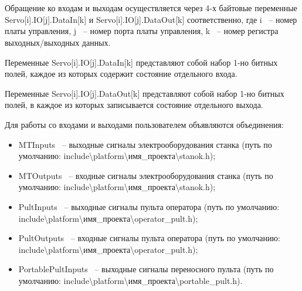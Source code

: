 



\section{}


Обращение ко входам и выходам осуществляется через 4-х байтовые переменные Servo[i].IO[j].DataIn[k] и Servo[i].IO[j].DataOut[k] соответственно, где i ~-- номер платы управления, j ~-- номер порта платы управления, k ~-- номер регистра выходных/выходных данных.

Переменные Servo[i].IO[j].DataIn[k] представляют собой набор 1-но битных полей, каждое из которых содержит состояние отдельного входа.

Переменные Servo[i].IO[j].DataOut[k] представляют собой набор 1-но битных полей, в каждое из которых записывается состояние отдельного выхода.\killoverfullbefore 

Для работы со входами и выходами пользователем объявляются \hypertarget{IO_union}{объединения}:
\begin{itemize}
\item MTInputs ~-- выходные сигналы электрооборудования станка (путь по умолчанию: include\textbackslash platform\textbackslash имя\_проекта\textbackslash stanok.h); \killoverfullbefore
\item MTOutputs ~-- входные сигналы электрооборудования станка (путь по умолчанию: include\textbackslash platform\textbackslash имя\_проекта\textbackslash stanok.h);\killoverfullbefore
\item PultInputs ~-- выходные сигналы пульта оператора (путь по умолчанию: include\textbackslash platform\textbackslash имя\_проекта\textbackslash operator\_pult.h);  \killoverfullbefore
\item PultOutputs ~-- входные сигналы пульта оператора (путь по умолчанию: include\textbackslash platform\textbackslash имя\_проекта\textbackslash operator\_pult.h); \killoverfullbefore
\item PortablePultInputs ~-- выходные сигналы переносного пульта (путь по умолчанию: include\textbackslash platform\textbackslash имя\_проекта\textbackslash portable\_pult.h). \killoverfullbefore \BL
\end{itemize} 

